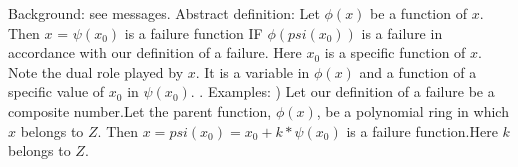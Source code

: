 \documentclass[12pt]{article}
\begin{document}
Background:  see  messages.
Abstract  definition:  Let  $\phi(x)$  be  a  function  of
$x$.  Then $x$  =  $\psi(x_0)$  is  a  failure  function  IF  $\phi(psi(x_0))$  is
a   failure  in  accordance  with  our  definition  of  a  failure. Here  $x_0$  is
a  specific  function  of  $x$.   Note  the dual  role  played  by  $x$. It  is  a  
variable  in  $\phi(x)$  and  a  function of  a  specific value  of  $x_0$  in $\psi(x_0)$.
              \para.
              Examples:
              )  Let  our  definition  of  a  failure  be  a  composite  number.Let the
              parent  function, $\phi(x)$,    be a  polynomial ring in which  $ x$ belongs to 
              $Z$.  Then  $x  = psi(x_0)  =  x_0  +  k*\psi(x_0)$  is  a  failure function.Here
              $k$  belongs to  $Z$.
               
\end{document}
